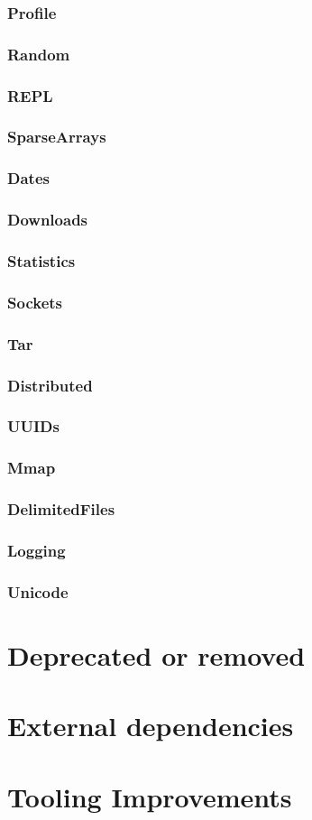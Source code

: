     \subsection{Profile}
    \subsection{Random}
    \subsection{REPL}
    \subsection{SparseArrays}
    \subsection{Dates}
    \subsection{Downloads}
    \subsection{Statistics}
    \subsection{Sockets}
    \subsection{Tar}
    \subsection{Distributed}
    \subsection{UUIDs}
    \subsection{Mmap}
    \subsection{DelimitedFiles}
    \subsection{Logging}
    \subsection{Unicode}
\chapter{Deprecated or removed}
\chapter{External dependencies}
\chapter{Tooling Improvements}
